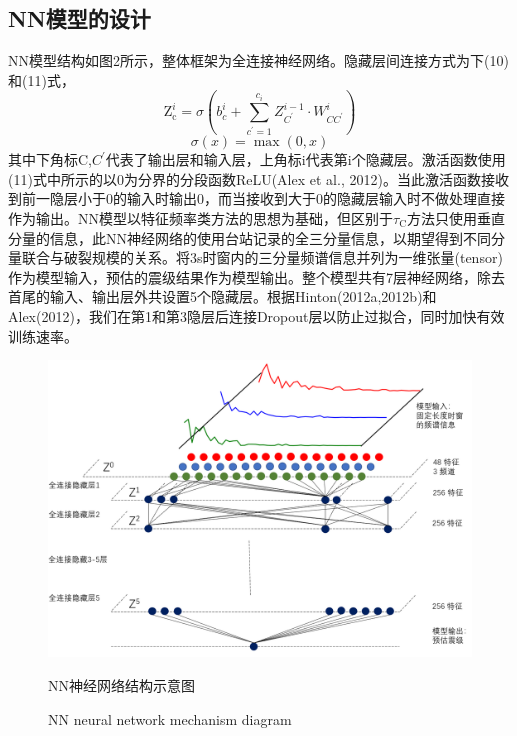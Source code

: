 \subsection{NN模型的设计}
\indent NN模型结构如图2所示，整体框架为全连接神经网络。隐藏层间连接方式为下(10)和(11)式，
\begin{equation}
\mathrm{Z}_{\mathrm{c}}^{i}=\sigma\left(b_{c}^{i}+\sum_{c^{\prime}=1}^{c_{i}} Z_{C^{\prime}}^{i-1} \cdot W_{C C^{\prime}}^{i}\right)
\end{equation}
\begin{equation}
\sigma(x)=\max (0, x)
\end{equation}
其中下角标C,$C^{\prime}$代表了输出层和输入层，上角标i代表第i个隐藏层。激活函数使用(11)式中所示的以0为分界的分段函数ReLU(Alex et al., 2012)。当此激活函数接收到前一隐层小于0的输入时输出0，而当接收到大于0的隐藏层输入时不做处理直接作为输出。NN模型以特征频率类方法的思想为基础，但区别于$\tau_{\mathrm{C}}$方法只使用垂直分量的信息，此NN神经网络的使用台站记录的全三分量信息，以期望得到不同分量联合与破裂规模的关系。将3s时窗内的三分量频谱信息并列为一维张量(tensor)作为模型输入，预估的震级结果作为模型输出。整个模型共有7层神经网络，除去首尾的输入、输出层外共设置5个隐藏层。根据Hinton(2012a,2012b)和Alex(2012)，我们在第1和第3隐层后连接Dropout层以防止过拟合，同时加快有效训练速率。\\
\begin{figure}[!h] 
\centering 
 \includegraphics[width=0.99\linewidth]{img/NN.png} 
 \renewcommand{\figurename}{图} 
\caption{NN神经网络结构示意图} 
\addtocounter{figure}{-1} \vspace{-5pt} 
\renewcommand{\figurename}{Fig} 
\caption{NN neural network mechanism diagram} 
\renewcommand{\figurename}{图} 
\label{fig:network-device-influence.png} 
\end{figure}

